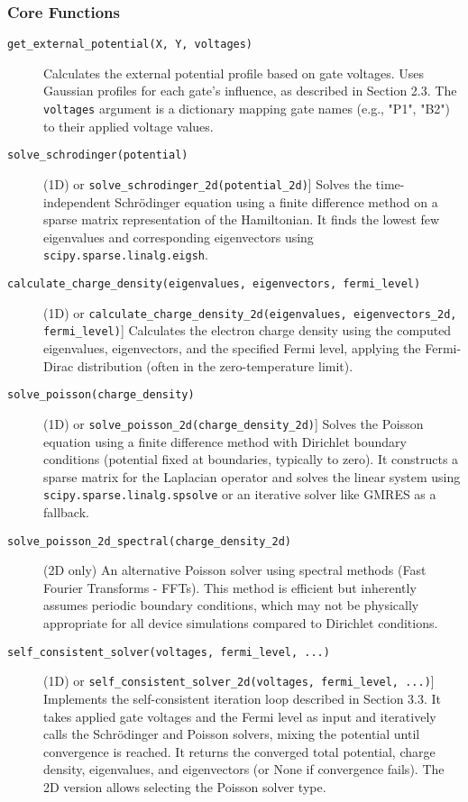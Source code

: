 \documentclass{article}
\begin{document}
\subsubsection{Core Functions}
\begin{description}
    \item[\texttt{get\_external\_potential(X, Y, voltages)}] Calculates the external potential profile based on gate voltages. Uses Gaussian profiles for each gate's influence, as described in Section 2.3. The \texttt{voltages} argument is a dictionary mapping gate names (e.g., "P1", "B2") to their applied voltage values.
    \item[\texttt{solve\_schrodinger(potential)}] (1D) or \texttt{solve\_schrodinger\_2d(potential\_2d)}] Solves the time-independent Schrödinger equation using a finite difference method on a sparse matrix representation of the Hamiltonian. It finds the lowest few eigenvalues and corresponding eigenvectors using \texttt{scipy.sparse.linalg.eigsh}.
    \item[\texttt{calculate\_charge\_density(eigenvalues, eigenvectors, fermi\_level)}] (1D) or \texttt{calculate\_charge\_density\_2d(eigenvalues, eigenvectors\_2d, fermi\_level)}] Calculates the electron charge density using the computed eigenvalues, eigenvectors, and the specified Fermi level, applying the Fermi-Dirac distribution (often in the zero-temperature limit).
    \item[\texttt{solve\_poisson(charge\_density)}] (1D) or \texttt{solve\_poisson\_2d(charge\_density\_2d)}] Solves the Poisson equation using a finite difference method with Dirichlet boundary conditions (potential fixed at boundaries, typically to zero). It constructs a sparse matrix for the Laplacian operator and solves the linear system using \texttt{scipy.sparse.linalg.spsolve} or an iterative solver like GMRES as a fallback.
    \item[\texttt{solve\_poisson\_2d\_spectral(charge\_density\_2d)}] (2D only) An alternative Poisson solver using spectral methods (Fast Fourier Transforms - FFTs). This method is efficient but inherently assumes periodic boundary conditions, which may not be physically appropriate for all device simulations compared to Dirichlet conditions.
    \item[\texttt{self\_consistent\_solver(voltages, fermi\_level, ...)}] (1D) or \texttt{self\_consistent\_solver\_2d(voltages, fermi\_level, ...)}] Implements the self-consistent iteration loop described in Section 3.3. It takes applied gate voltages and the Fermi level as input and iteratively calls the Schrödinger and Poisson solvers, mixing the potential until convergence is reached. It returns the converged total potential, charge density, eigenvalues, and eigenvectors (or None if convergence fails). The 2D version allows selecting the Poisson solver type.
\end{description}
\end{document}
